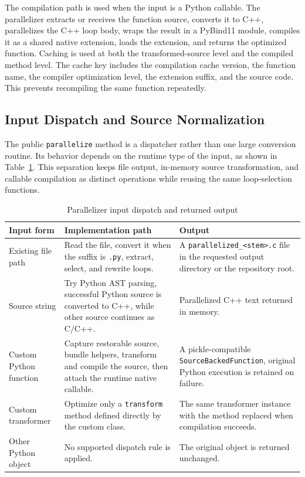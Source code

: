 The compilation path is used when the input is a Python callable. The
parallelizer extracts or receives the function source, converts it to C++,
parallelizes the C++ loop body, wraps the result in a PyBind11 module, compiles
it as a shared native extension, loads the extension, and returns the optimized
function. Caching is used at both the transformed-source level and the compiled
method level. The cache key includes the compilation cache version, the function
name, the compiler optimization level, the extension suffix, and the source
code. This prevents recompiling the same function repeatedly.

\subsection{Input Dispatch and Source Normalization}

The public \texttt{parallelize} method is a dispatcher rather than one large
conversion routine. Its behavior depends on the runtime type of the input, as
shown in Table~\ref{tab:parallelizer-input-dispatch}. This separation keeps file
output, in-memory source transformation, and callable compilation as distinct
operations while reusing the same loop-selection functions.

\begin{table}[H]
\centering
\small
\renewcommand{\arraystretch}{1.12}
\setlength{\tabcolsep}{4pt}
\caption{Parallelizer input dispatch and returned output}
\label{tab:parallelizer-input-dispatch}
\begin{tabularx}{\textwidth}{p{}p{}X}
\toprule
\textbf{Input form} & \textbf{Implementation path} & \textbf{Output} \\
\midrule
Existing file path & Read the file, convert it when the suffix is
\texttt{.py}, extract, select, and rewrite loops. & A
\texttt{parallelized\_<stem>.c} file in the requested output directory or the
repository root. \\
\midrule
Source string & Try Python AST parsing, successful Python source is converted
to C++, while other source continues as C/C++. & Parallelized C++ text returned
in memory. \\
\midrule
Custom Python function & Capture restorable source, bundle helpers, transform
and compile the source, then attach the runtime native callable. & A
pickle-compatible \texttt{SourceBackedFunction}, original Python execution is
retained on failure. \\
\midrule
Custom transformer & Optimize only a \texttt{transform} method defined directly
by the custom class. & The same transformer instance with the method replaced
when compilation succeeds. \\
\midrule
Other Python object & No supported dispatch rule is applied. & The original
object is returned unchanged. \\
\bottomrule
\end{tabularx}
\end{table}

